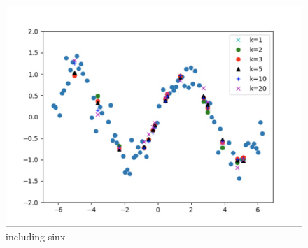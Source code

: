 \begin{answer}
\begin{figure}
    \centering
    \includegraphics[width=0.5\linewidth]{Screenshot 2024-01-16 at 22.50.53.png}
    \caption{including-sinx}
    \label{fig:enter-label}
\end{figure}
\end{answer}

